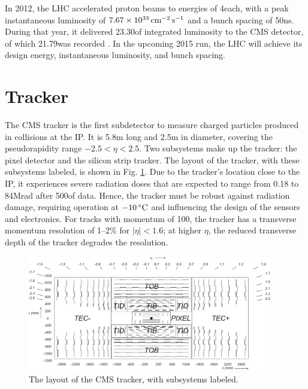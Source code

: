 \documentclass[12pt]{thesis}  %
\newcommand{\degC}{\ensuremath{\,\de\text{C}}\xspace}
\begin{document}
In 2012, the LHC accelerated proton beams to energies of 4\TeV each, with a peak instantaneous luminosity of $7.67\times10^{33}\,\text{cm}^\text{$-$2}\,\text{s}^\text{$-$1}$ and a bunch spacing of 50\unit{ns}. During that year, it delivered 23.30\fbinv of integrated luminosity to the CMS detector, of which 21.79\fbinv was recorded \cite{LumiPublic}. In the upcoming 2015 run, the LHC will achieve its design energy, instantaneous luminosity, and bunch spacing.

\section{Tracker}
\label{sec:tracker}

The CMS tracker is the first subdetector to measure charged particles produced in collisions at the IP. It is 5.8\unit{m} long and 2.5\unit{m} in diameter, covering the pseudorapidity range $-2.5 < \eta < 2.5$. Two subsystems make up the tracker: the pixel detector and the silicon strip tracker. The layout of the tracker, with these subsystems labeled, is shown in Fig. \ref{fig:tk-layout}. Due to the tracker's location close to the IP, it experiences severe radiation doses that are expected to range from 0.18 to 84\unit{Mrad} after 500\fbinv of data. Hence, the tracker must be robust against radiation damage, requiring operation at $-10\degC$ and influencing the design of the sensors and electronics. For tracks with momentum of 100\GeV, the tracker has a transverse momentum resolution of 1--2\% for $|\eta|<1.6$; at higher $\eta$, the reduced transverse depth of the tracker degrades the resolution.

\begin{figure}[hbt]
\begin{center}
\includegraphics[width=0.95\textwidth]{figures/CMS_tracker.pdf}
\caption{The layout of the CMS tracker, with subsystems labeled.}
\label{fig:tk-layout}
\end{center}
\end{figure}
\end{document}

